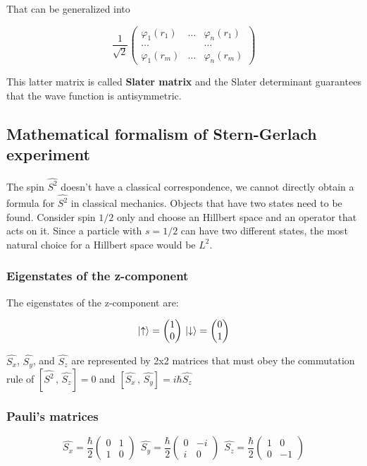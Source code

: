 		That can be generalized into

 		$$\frac{1}{\sqrt{2}}\begin{pmatrix} \varphi_1(r_1)&\dots&\varphi_n(r_1)\\\dots& &\dots\\ \varphi_1(r_m)&\dots&\varphi_n(r_m) \end{pmatrix}$$

		This latter matrix is called \textbf{Slater matrix} and the Slater determinant guarantees that the wave function is antisymmetric.

	\subsection{Mathematical formalism of Stern-Gerlach experiment}
	The spin $\hat{S^2}$ doesn't have a classical correspondence, we cannot directly obtain a formula for $\hat{S^2}$ in classical mechanics.
	Objects that have two states need to be found.
	Consider spin $1/2$ only and choose an Hillbert space and an operator that acts on it.
Since a particle with $s=1/2$ can have two different states, the most natural choice for a Hillbert space would be \emph{$L^2$}.

		\subsubsection{Eigenstates of the z-component}
		The eigenstates of the z-component are:

		$$\ket{\uparrow}=\begin{pmatrix}1\\0\end{pmatrix}\, \ket{\downarrow}=\begin{pmatrix}0\\1\end{pmatrix}$$

		$\hat{S_x}$, $\hat{S_y}$, and $\hat{S_z}$ are represented by 2x2 matrices that must obey the commutation rule of $[\hat{S^2}\,,\,\hat{S_z}]=0$ and $[\hat{S_x}\,,\,\hat{S_y}]=i\hbar\hat{S_z}$

		\subsubsection{Pauli's matrices}

		$$\hat{S_x}=\frac{\hbar}{2}\begin{pmatrix}0&1\\1&0\end{pmatrix}\;\,\hat{S_y}=\frac{\hbar}{2}\begin{pmatrix}0&-i\\i&0\end{pmatrix}\;\,	\hat{S_z}=\frac{\hbar}{2}\begin{pmatrix}1&0\\0&-1\end{pmatrix}$$

